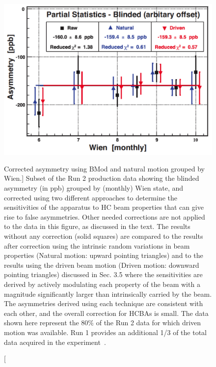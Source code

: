 \begin{singlespace}
\begin{figure}[!h]
	\begin{center}
	\includegraphics[width=12.0cm]{figures/BModNaturalCorrections}
	\end{center}
	\caption
	[Corrected asymmetry using BMod and natural motion grouped by Wien.]
	{Subset of the Run 2 production data showing the blinded asymmetry (in ppb) grouped by (monthly) Wien state, and corrected using two different approaches to determine the sensitivities of the apparatus to HC beam properties that can give rise to false asymmetries. Other needed corrections are not applied to the data in this figure, as discussed in the text. The results without any correction (solid squares) are compared to the results after correction using the intrinsic random variations in beam properties (Natural motion: upward pointing triangles) and to the results using the driven beam motion (Driven motion: downward pointing triangles) discussed in Sec. 3.5 where the sensitivities are derived by actively modulating each property of the beam with a magnitude significantly larger than intrinsically carried by the beam. The asymmetries derived using each technique are consistent with each other, and the overall correction for HCBAs is small. The data shown here represent the 80\% of the Run 2 data for which driven motion was available. Run 1 provides an additional 1/3 of the total data acquired in the experiment~\cite{Allison:2014tpu}.}
	\label{fig:BModNaturalCorrections}
\end{figure}
\end{singlespace}








